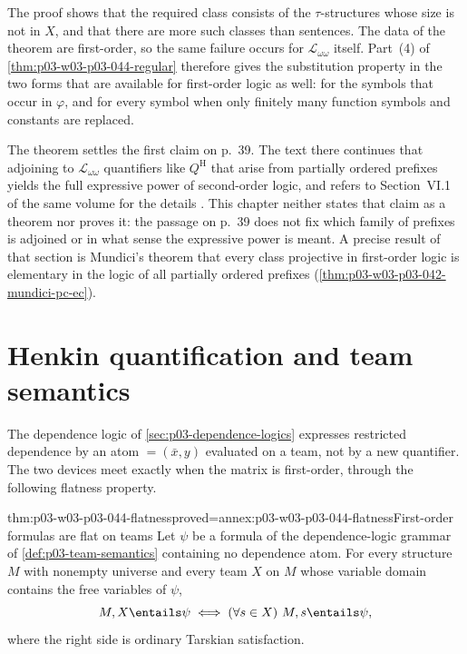 The proof shows that the required class consists of the
\(\tau\)-structures whose size is not in \(X\), and that there are more such
classes than sentences.  The data of the theorem are first-order, so the
same failure occurs for \(\mathscr L_{\omega\omega}\) itself.  Part~(4) of
\cref{thm:p03-w03-p03-044-regular} therefore gives the substitution property
in the two forms that are available for first-order logic as well: for the
symbols that occur in \(\varphi\), and for every symbol when only finitely
many function symbols and constants are replaced.

The theorem settles the first claim on p.~39.  The text there continues that
adjoining to \(\mathscr L_{\omega\omega}\) quantifiers like \(Q^{\mathrm H}\)
that arise from partially ordered prefixes yields the full expressive power
of second-order logic, and refers to Section~VI.1 of the same volume for the
details \cite[p.~39]{Ebbinghaus1985ExtendedLogics}.  This chapter neither
states that claim as a theorem nor proves it: the passage on p.~39 does not
fix which family of prefixes is adjoined or in what sense the expressive
power is meant.  A precise result of that section is Mundici's theorem that
every class projective in first-order logic is elementary in the logic of
all partially ordered prefixes (\cref{thm:p03-w03-p03-042-mundici-pc-ec}).

\section{Henkin quantification and team semantics}
\label{sec:p03-w03-p03-044-teams}

The dependence logic of \cref{sec:p03-dependence-logics} expresses
restricted dependence by an atom \(=(\bar x,y)\) evaluated on a team, not by
a new quantifier.  The two devices meet exactly when the matrix is
first-order, through the following flatness property.

\begin{hblemma}{thm:p03-w03-p03-044-flatness}{proved=annex:p03-w03-p03-044-flatness}{First-order formulas are flat on teams}
Let \(\psi\) be a formula of the dependence-logic grammar of
\cref{def:p03-team-semantics} containing no dependence atom.  For every
structure \(M\) with nonempty universe and every team \(X\) on \(M\) whose
variable domain contains the free variables of \(\psi\),
\[
 M,X\entails\psi\iff(\forall s\in X)\ M,s\entails\psi,
\]
where the right side is ordinary Tarskian satisfaction.
\end{hblemma}

